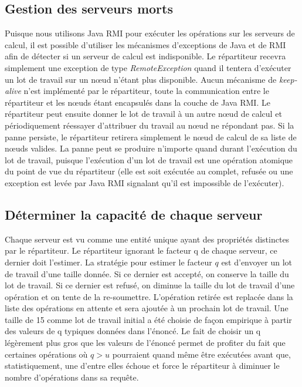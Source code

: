 \subsection{Gestion des serveurs morts}
Puisque nous utilisons Java RMI pour exécuter les opérations sur les serveurs de calcul, il est possible d'utiliser les mécanismes d'exceptions de Java et 
de RMI afin de détecter si un serveur de calcul est indisponible. Le répartiteur recevra simplement une exception de type \emph{RemoteException}
quand il tentera d'exécuter un lot de travail sur un nœud n'étant plus disponible. Aucun mécanisme de \emph{keep-alive} n'est implémenté par le répartiteur, toute la communication 
entre le répartiteur et les nœuds étant encapsulés dans la couche de Java RMI. Le répartiteur peut ensuite donner le lot de travail à un autre nœud de calcul et périodiquement 
réessayer d'attribuer du travail au nœud ne répondant pas. Si la panne persiste, le répartiteur retirera simplement le nœud de calcul de sa liste de nœuds valides. La panne peut se
produire n'importe quand durant l'exécution du lot de travail, puisque l'exécution d'un lot de travail est une opération atomique du point de vue du répartiteur (elle est soit exécutée au complet, 
refusée ou une exception est levée par Java RMI signalant qu'il est impossible de l'exécuter). 

\subsection{Déterminer la capacité de chaque serveur }
Chaque serveur est vu comme une entité unique ayant des propriétés distinctes par le répartiteur. Le répartiteur ignorant le facteur q de chaque
serveur, ce dernier doit l'estimer. La stratégie pour estimer le facteur $ q $ est d'envoyer un lot de travail d'une taille donnée. Si ce dernier est accepté, on 
conserve la taille du lot de travail. Si ce dernier est refusé, on diminue la taille du lot de travail d'une opération et on tente de la re-soumettre. L'opération 
retirée est replacée dans la liste des opérations en attente et sera ajoutée à un prochain lot de travail. Une taille de 15 comme lot de travail initial a été 
choisie de façon empirique à partir des valeurs de q typiques données dans l'énoncé. Le fait de choisir un q légèrement plus gros que les valeurs de l'énoncé permet
de profiter du fait que certaines opérations où $ q > u $ pourraient quand même être exécutées avant que, statistiquement, une d'entre elles échoue et force le 
répartiteur à diminuer le nombre d'opérations dans sa requête. 

